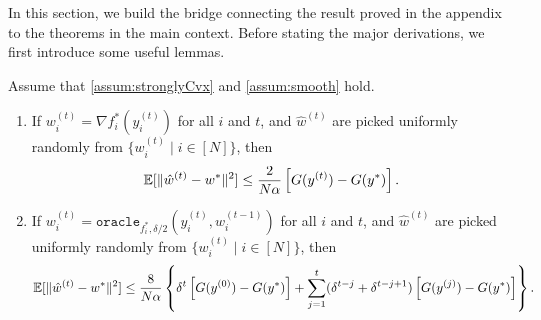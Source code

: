 In this section, we build the bridge connecting the result proved in the appendix to the theorems in the main context. Before stating the major derivations, we first introduce some useful lemmas.
\begin{lemma} \label{lemma:relation_primal_dual}
    Assume that \autoref{assum:stronglyCvx} and \autoref{assum:smooth} hold.  
    \begin{enumerate}
        \item If $w_i^{(t)} = \nabla f_i^*(y_i^{(t)})$ for all $i$ and $t$, and $\hat w^{(t)}$ are picked uniformly randomly from $\{w_i^{(t)}\mid i\in[N]\}$, then
        \begin{align}
            \mathbb{E}[\|\hat w^{(t)} - w^*\|^2] \leq \frac{2}{N \alpha}\left[G(y^{(t)}) - G(y^*) \right].
        \end{align}
        \item If $w_i^{(t)} = \texttt{oracle}_{f_i^*, \delta/2}(y^{(t)}_i, w_{i}^{(t-1)})$ for all $i$ and $t$, and $\hat w^{(t)}$ are picked uniformly randomly from $\{w_i^{(t)}\mid i\in[N]\}$, then
        \[\mathbb{E}[\|\hat w^{(t)} - w^*\|^2] \leq \frac{8}{N\alpha} \left\{ \delta^t\left[G(y^{(0)}) - G(y^*)\right] + \sum_{j=1}^t (\delta^{t-j} + \delta^{t-j+1})\left[G(y^{(j)}) - G(y^*)\right]\right\}.\]
    \end{enumerate}
\end{lemma}
